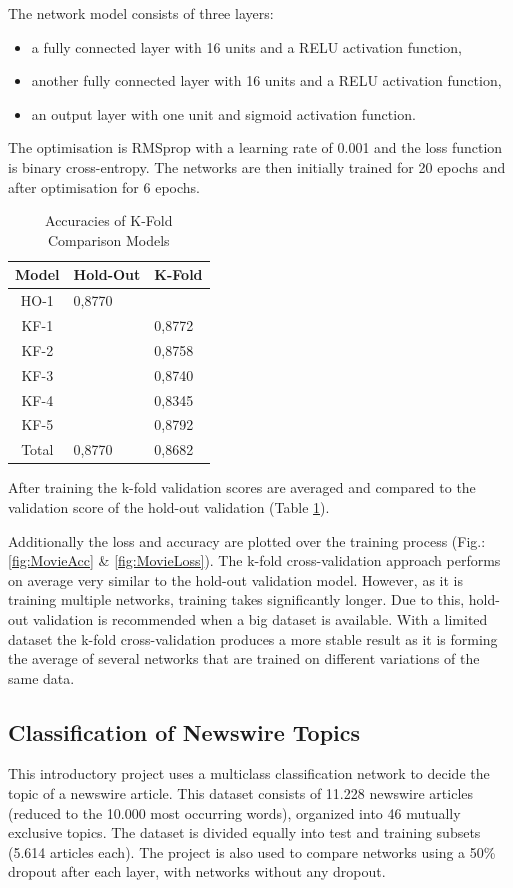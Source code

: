 \documentclass[sigconf, nonacm]{acmart}
\begin{document}
The network model consists of three layers:
\begin{itemize}
\item a fully connected layer with 16 units and a RELU activation function,
\item another fully connected layer with 16 units and a RELU activation function,
\item an output layer with one unit and sigmoid activation function.
\end{itemize}
The optimisation is RMSprop with a learning rate of 0.001 and the loss function is binary cross-entropy.
The networks are then initially trained for 20 epochs and after optimisation for 6 epochs.

\begin{table}[h]
  \caption{Accuracies of K-Fold Comparison Models}
  \label{tab:kfoldAccuracy}
  \begin{tabular}{ c | l l }
    \toprule
    Model & Hold-Out & K-Fold\\
    \midrule
    HO-1 & 0,8770 &        \\
	KF-1 &        & 0,8772 \\
	KF-2 &        & 0,8758 \\
	KF-3 &        & 0,8740 \\
	KF-4 &        & 0,8345 \\
	KF-5 &        & 0,8792 \\
	\midrule
	Total & 0,8770 & 0,8682 \\
  	\bottomrule
  \end{tabular}
\end{table}

After training the k-fold validation scores are averaged and compared to the validation score of the hold-out validation (Table \ref{tab:kfoldAccuracy}).

Additionally the loss and accuracy are plotted over the training process (Fig.: \ref{fig:MovieAcc} \& \ref{fig:MovieLoss}).
The k-fold cross-validation approach performs on average very similar to the hold-out validation model.
However, as it is training multiple networks, training takes significantly longer.
Due to this, hold-out validation is recommended when a big dataset is available.
With a limited dataset the k-fold cross-validation produces a more stable result as it is forming the average of several networks that are trained on different variations of the same data.

\subsection{Classification of Newswire Topics}
This introductory project uses a multiclass classification network to decide the topic of a newswire article.
This dataset consists of 11.228 newswire articles (reduced to the 10.000 most occurring words), organized into 46 mutually exclusive topics.
The dataset is divided equally into test and training subsets (5.614 articles each).
The project is also used to compare networks using a 50\% dropout after each layer, with networks without any dropout.
\end{document}
